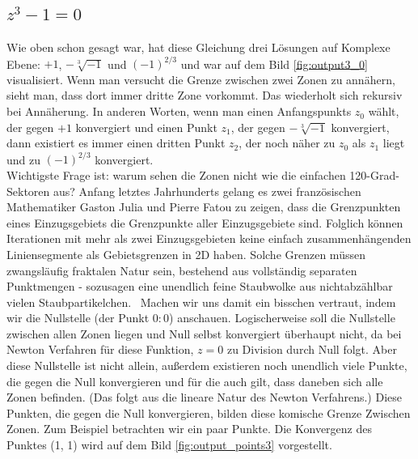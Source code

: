 \documentclass[a4paper,12pt]{llncs}
\numberwithin{equation}{section}
\begin{document}
\subsection{$z^3 - 1 = 0$}
Wie oben schon gesagt war, hat diese Gleichung drei Lösungen auf Komplexe Ebene: $+1$, $-\sqrt[3]{-1}$ und $(-1)^{2/3}$ und war auf dem Bild \ref{fig:output3_0} visualisiert. 
Wenn man versucht die Grenze zwischen zwei Zonen zu annähern, sieht man, dass dort immer dritte Zone vorkommt. 
Das wiederholt sich rekursiv bei Annäherung.
In anderen Worten, wenn man einen Anfangspunkts $z_0$ wählt, der gegen $+1$ konvergiert und einen Punkt $z_1$, der gegen  $-\sqrt[3]{-1}$ konvergiert, dann existiert es immer einen dritten Punkt $z_2$, der noch näher zu $z_0$ als $z_1$ liegt und zu $(-1)^{2/3}$ konvergiert. \\
Wichtigste Frage ist: warum sehen die Zonen nicht wie die einfachen 120-Grad-Sektoren aus?
Anfang letztes Jahrhunderts gelang es zwei französischen Mathematiker Gaston Julia und Pierre Fatou zu zeigen, dass die Grenzpunkten eines Einzugsgebiets die Grenzpunkte aller Einzugsgebiete sind. 
Folglich können Iterationen mit mehr als zwei Einzugsgebieten keine einfach zusammenhängenden Liniensegmente als Gebietsgrenzen in 2D haben. 
Solche Grenzen müssen zwangsläufig fraktalen Natur sein, bestehend aus vollständig separaten Punktmengen - sozusagen eine unendlich feine Staubwolke aus nichtabzählbar vielen Staubpartikelchen.~\cite{frak_cha}
Machen wir uns damit ein bisschen vertraut, indem wir die Nullstelle (der Punkt $0:0$) anschauen.
Logischerweise soll die Nullstelle zwischen allen Zonen liegen und Null selbst konvergiert überhaupt nicht, da bei Newton Verfahren für diese Funktion, $z=0$ zu Division durch Null folgt.
Aber diese Nullstelle ist nicht allein, außerdem existieren noch unendlich viele Punkte, die gegen die Null konvergieren und für die auch gilt, dass daneben sich alle Zonen befinden.
(Das folgt aus die lineare Natur des Newton Verfahrens.)
Diese Punkten, die gegen die Null konvergieren, bilden diese komische Grenze Zwischen Zonen. 
Zum Beispiel betrachten wir ein paar Punkte. 
Die Konvergenz des Punktes (1, 1) wird auf dem Bild \ref{fig:output_points3} vorgestellt.
\end{document}
